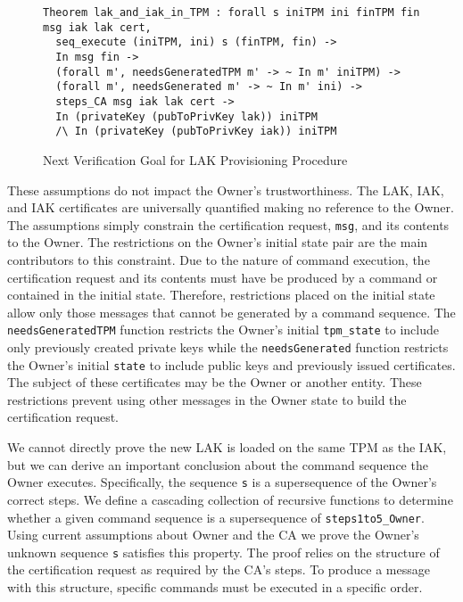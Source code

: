 \documentclass[runningheads]{llncs}
\begin{document}
\begin{figure}[hbtp]
\begin{lstlisting}[language=Coq]
Theorem lak_and_iak_in_TPM : forall s iniTPM ini finTPM fin msg iak lak cert,
  seq_execute (iniTPM, ini) s (finTPM, fin) -> 
  In msg fin ->
  (forall m', needsGeneratedTPM m' -> ~ In m' iniTPM) ->
  (forall m', needsGenerated m' -> ~ In m' ini) ->
  steps_CA msg iak lak cert ->
  In (privateKey (pubToPrivKey lak)) iniTPM
  /\ In (privateKey (pubToPrivKey iak)) iniTPM
\end{lstlisting}
\caption{Next Verification Goal for LAK Provisioning Procedure}
\label{fig:lak_goal}
\end{figure}

These assumptions do not impact the Owner's trustworthiness. The LAK,
IAK, and IAK certificates are universally quantified making no
reference to the Owner. The assumptions simply constrain the
certification request, \verb|msg|, and its contents to the Owner.  The
restrictions on the Owner's initial state pair are the main
contributors to this constraint. Due to the nature of command
execution, the certification request and its contents must have be
produced by a command or contained in the initial state.  Therefore,
restrictions placed on the initial state allow only those messages
that cannot be generated by a command sequence.  The
\verb|needsGeneratedTPM| function restricts the Owner's initial
\verb|tpm_state| to include only previously created private keys while
the \verb|needsGenerated| function restricts the Owner's initial
\verb|state| to include public keys and previously issued
certificates.  The subject of these certificates may be the Owner or
another entity.  These restrictions prevent using other messages in the
Owner state to build the certification request.

We cannot directly prove the new LAK is loaded on the same TPM as the
IAK, but we can derive an important conclusion about the command
sequence the Owner executes. Specifically, the sequence \verb|s| is a
supersequence of the Owner's correct steps.  We define a cascading
collection of recursive functions to determine whether a given command
sequence is a supersequence of \verb|steps1to5_Owner|.  Using current
assumptions about Owner and the CA we prove the Owner's unknown
sequence \verb|s| satisfies this property. The proof relies on the
structure of the certification request as required by the CA's
steps. To produce a message with this structure, specific
commands must be executed in a specific order.
\end{document}
